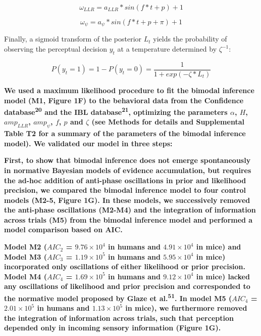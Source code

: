 \documentclass[
]{article}
\begin{document}
\begin{equation}
\omega_{LLR} = a_{LLR} * sin(f * t + p) + 1
\end{equation}

\begin{equation}
\omega_{\psi} = a_{\psi} * sin(f * t + p + \pi) + 1
\end{equation}

Finally, a sigmoid transform of the posterior \(L_t\) yields the
probability of observing the perceptual decision \(y_t\) at a
temperature determined by \(\zeta^{-1}\):

\begin{equation}
P(y_t = 1) = 1 - P(y_t = 0) = \frac{1}{1 + exp(-\zeta * L_t)}
\end{equation}

\textbf{We used a maximum likelihood procedure to fit the bimodal
inference model (M1, Figure 1F) to the behavioral data from the
Confidence database\textsuperscript{20} and the IBL
database\textsuperscript{21}, optimizing the parameters \(\alpha\),
\(H\), \(amp_{LLR}\), \(amp_{\psi}\), \(f\), \(p\) and \(\zeta\) (see
Methods for details and Supplemental Table T2 for a summary of the
parameters of the bimodal inference model). We validated our model in
three steps:}

\textbf{First, to show that bimodal inference does not emerge
spontaneously in normative Bayesian models of evidence accumulation, but
requires the ad-hoc addition of anti-phase oscillations in prior and
likelihood precision, we compared the bimodal inference model to four
control models (M2-5, Figure 1G). In these models, we successively
removed the anti-phase oscillations (M2-M4) and the integration of
information across trials (M5) from the bimodal inference model and
performed a model comparison based on AIC.}

\textbf{Model M2 (\(AIC_2\) = \(\ensuremath{9.76\times 10^{4}}\) in
humans and \(\ensuremath{4.91\times 10^{4}}\) in mice) and Model M3
(\(AIC_3\) = \(\ensuremath{1.19\times 10^{5}}\) in humans and
\(\ensuremath{5.95\times 10^{4}}\) in mice) incorporated only
oscillations of either likelihood or prior precision. Model M4
(\(AIC_4\) = \(\ensuremath{1.69\times 10^{5}}\) in humans and
\(\ensuremath{9.12\times 10^{4}}\) in mice) lacked any oscillations of
likelihood and prior precision and corresponded to the normative model
proposed by Glaze et al.\textsuperscript{51}. In model M5 (\(AIC_4\) =
\(\ensuremath{2.01\times 10^{5}}\) in humans and
\(\ensuremath{1.13\times 10^{5}}\) in mice), we furthermore removed the
integration of information across trials, such that perception depended
only in incoming sensory information (Figure 1G).}
\end{document}

